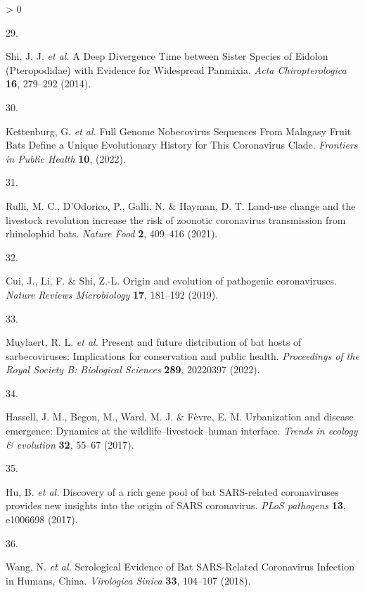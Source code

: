 \documentclass[10pt,oneside]{article}
\newlength{\cslhangindent}
\newlength{\csllabelwidth}
\newenvironment{CSLReferences}[3] %
 {%
  \setlength{\parindent}{0pt}
  \ifodd #1 \everypar{\setlength{\hangindent}{\cslhangindent}}\ignorespaces\fi
  \ifnum #2 > 0
  \setlength{\parskip}{#2\baselineskip}
  \fi
 }%
 {}
\newcommand{\CSLLeftMargin}[1]{\parbox[t]{\maxof{\widthof{#1}}{\csllabelwidth}}{#1}}
\newcommand{\CSLRightInline}[1]{\parbox[t]{\linewidth}{#1}}
\begin{document}
\begin{CSLReferences}{0}{0}
\leavevmode\hypertarget{ref-Shi2014Deep}{}%
\CSLLeftMargin{29. }
\CSLRightInline{Shi, J. J. \emph{et al.} A Deep Divergence Time between
Sister Species of Eidolon (Pteropodidae) with Evidence for Widespread
Panmixia. \emph{Acta Chiropterologica} \textbf{16}, 279--292 (2014).}

\leavevmode\hypertarget{ref-Kettenburg2022Full}{}%
\CSLLeftMargin{30. }
\CSLRightInline{Kettenburg, G. \emph{et al.} Full Genome Nobecovirus
Sequences From Malagasy Fruit Bats Define a Unique Evolutionary History
for This Coronavirus Clade. \emph{Frontiers in Public Health}
\textbf{10}, (2022).}

\leavevmode\hypertarget{ref-Rulli2021Landuse}{}%
\CSLLeftMargin{31. }
\CSLRightInline{Rulli, M. C., D'Odorico, P., Galli, N. \& Hayman, D. T.
Land-use change and the livestock revolution increase the risk of
zoonotic coronavirus transmission from rhinolophid bats. \emph{Nature
Food} \textbf{2}, 409--416 (2021).}

\leavevmode\hypertarget{ref-Cui2019Origin}{}%
\CSLLeftMargin{32. }
\CSLRightInline{Cui, J., Li, F. \& Shi, Z.-L. Origin and evolution of
pathogenic coronaviruses. \emph{Nature Reviews Microbiology}
\textbf{17}, 181--192 (2019).}

\leavevmode\hypertarget{ref-Muylaert2022Present}{}%
\CSLLeftMargin{33. }
\CSLRightInline{Muylaert, R. L. \emph{et al.} Present and future
distribution of bat hosts of sarbecoviruses: Implications for
conservation and public health. \emph{Proceedings of the Royal Society
B: Biological Sciences} \textbf{289}, 20220397 (2022).}

\leavevmode\hypertarget{ref-Hassell2017Urbanization}{}%
\CSLLeftMargin{34. }
\CSLRightInline{Hassell, J. M., Begon, M., Ward, M. J. \& Fèvre, E. M.
Urbanization and disease emergence: Dynamics at the
wildlife--livestock--human interface. \emph{Trends in ecology \&
evolution} \textbf{32}, 55--67 (2017).}

\leavevmode\hypertarget{ref-Hu2017Discovery}{}%
\CSLLeftMargin{35. }
\CSLRightInline{Hu, B. \emph{et al.} Discovery of a rich gene pool of
bat SARS-related coronaviruses provides new insights into the origin of
SARS coronavirus. \emph{PLoS pathogens} \textbf{13}, e1006698 (2017).}

\leavevmode\hypertarget{ref-Wang2018Serological}{}%
\CSLLeftMargin{36. }
\CSLRightInline{Wang, N. \emph{et al.} Serological Evidence of Bat
SARS-Related Coronavirus Infection in Humans, China. \emph{Virologica
Sinica} \textbf{33}, 104--107 (2018).}


\end{CSLReferences}
\end{document}
